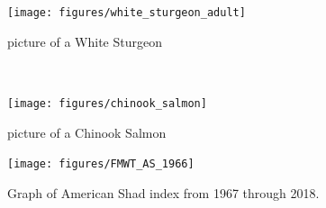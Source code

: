 \documentclass[
]{book}
\begin{document}
\begin{panel-grid}
\begin{columns-nocenter}
\begin{column800}

\begin{figure}

{\centering \texttt{[image: figures/white\_sturgeon\_adult]} 

}

\caption{picture of a White Sturgeon}\label{fig:unnamed-chunk-128}
\end{figure}

\end{column800}

\begin{column40}

~

\end{column40}

\begin{column800}

\begin{figure}

{\centering \texttt{[image: figures/chinook\_salmon]} 

}

\caption{picture of a Chinook Salmon}\label{fig:unnamed-chunk-129}
\end{figure}

\end{column800}

\end{columns-nocenter}

\begin{columns-nocenter}

\begin{column800}

\begin{expand}

\begin{figure}
\texttt{[image: figures/FMWT\_AS\_1966]} \caption{Graph of American Shad index from 1967 through 2018.}\label{fig:unnamed-chunk-130}
\end{figure}

\end{expand}

\end{column800}

\begin{column40}

~

\end{column40}

\begin{column800}


\end{column800}
\end{columns-nocenter}
\end{panel-grid}
\end{document}
